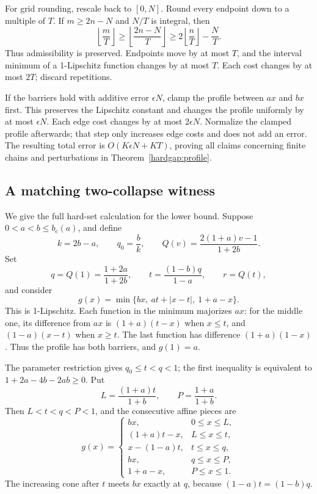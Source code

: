 For grid rounding, rescale back to \([0,N]\). Round every endpoint
down to a multiple of \(T\). If \(m\ge2n-N\) and \(N/T\)
is integral, then
\[
 \left\lfloor\frac mT\right\rfloor
 \ge\left\lfloor\frac{2n-N}{T}\right\rfloor
 \ge2\left\lfloor\frac nT\right\rfloor-\frac NT.
\]
Thus admissibility is preserved. Endpoints move by at most \(T\), and
the interval minimum of a 1-Lipschitz function changes by at most \(T\).
Each cost changes by at most \(2T\); discard repetitions.

If the barriers hold with additive error \(\epsilon N\), clamp the
profile between \(ax\) and \(bx\) first. This preserves the Lipschitz
constant and changes the profile uniformly by at most \(\epsilon N\).
Each edge cost changes by at most \(2\epsilon N\). Normalize the
clamped profile afterwards; that step only increases edge costs and does
not add an error. The resulting total error is
\(O(K\epsilon N+KT)\), proving all claims concerning finite chains
and perturbations in Theorem~\ref{hardgap:profile}.

\subsection{A matching two-collapse witness}
\label{hardgap:two-witness}

We give the full hard-set calculation for the lower bound. Suppose
\(0<a<b\le b_{\mathrm c}(a)\), and define
\[
 k=2b-a,\qquad q_0=\frac b{k},\qquad
 Q(v)=\frac{2(1+a)v-1}{1+2b}.
\]
Set
\[
 q=Q(1)=\frac{1+2a}{1+2b},\qquad
 t=\frac{(1-b)q}{1-a},\qquad r=Q(t),
\]
and consider
\begin{equation}\label{hardgap:two-profile}
 g(x)=\min\{bx,\ at+|x-t|,\ 1+a-x\}.
\end{equation}
This is 1-Lipschitz. Each function in the minimum majorizes \(ax\):
for the middle one, its difference from \(ax\) is
\((1+a)(t-x)\) when \(x\le t\), and \((1-a)(x-t)\) when
\(x\ge t\). The last function has difference \((1+a)(1-x)\).
Thus the profile has both barriers, and \(g(1)=a\).

The parameter restriction gives \(q_0\le t<q<1\); the first inequality
is equivalent to \(1+2a-4b-2ab\ge0\). Put
\[
 L=\frac{(1+a)t}{1+b},\qquad P=\frac{1+a}{1+b}.
\]
Then \(L<t<q<P<1\), and the consecutive affine pieces are
\begin{equation}\label{hardgap:two-pieces}
 g(x)=\begin{cases}
 bx,&0\le x\le L,\\
 (1+a)t-x,&L\le x\le t,\\
 x-(1-a)t,&t\le x\le q,\\
 bx,&q\le x\le P,\\
 1+a-x,&P\le x\le1.
 \end{cases}
\end{equation}
The increasing cone after \(t\) meets \(bx\) exactly at \(q\),
because \((1-a)t=(1-b)q\).

